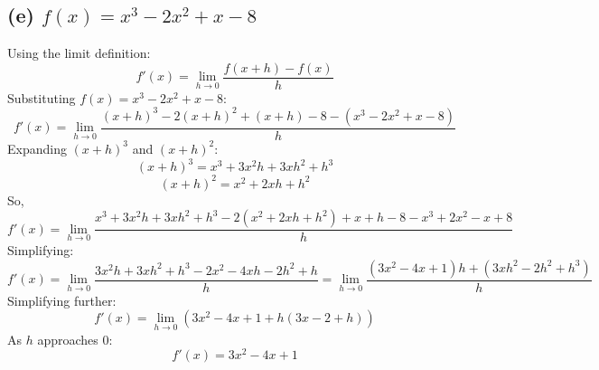 \documentclass{article}
\begin{document}
\begin{enumerate}[itemsep=20pt]
\subsection*{(e) \( f(x) = x^3 - 2x^2 + x - 8 \)}

Using the limit definition:
\[
f'(x) = \lim_{h \to 0} \frac{f(x+h) - f(x)}{h}
\]
Substituting \( f(x) = x^3 - 2x^2 + x - 8 \):
\[
f'(x) = \lim_{h \to 0} \frac{(x+h)^3 - 2(x+h)^2 + (x+h) - 8 - \left( x^3 - 2x^2 + x - 8 \right)}{h}
\]
Expanding \( (x+h)^3 \) and \( (x+h)^2 \):
\[
(x+h)^3 = x^3 + 3x^2h + 3xh^2 + h^3
\]
\[
(x+h)^2 = x^2 + 2xh + h^2
\]
So,
\[
f'(x) = \lim_{h \to 0} \frac{x^3 + 3x^2h + 3xh^2 + h^3 - 2(x^2 + 2xh + h^2) + x + h - 8 - x^3 + 2x^2 - x + 8}{h}
\]
Simplifying:
\[
f'(x) = \lim_{h \to 0} \frac{3x^2h + 3xh^2 + h^3 - 2x^2 - 4xh - 2h^2 + h}{h} = \lim_{h \to 0} \frac{(3x^2 - 4x + 1)h + (3xh^2 - 2h^2 + h^3)}{h}
\]
Simplifying further:
\[
f'(x) = \lim_{h \to 0} \left(3x^2 - 4x + 1 + h(3x - 2 + h)\right)
\]
As \( h \) approaches 0:
\[
f'(x) = 3x^2 - 4x + 1
\]
    \end{enumerate}
    
\end{document}
